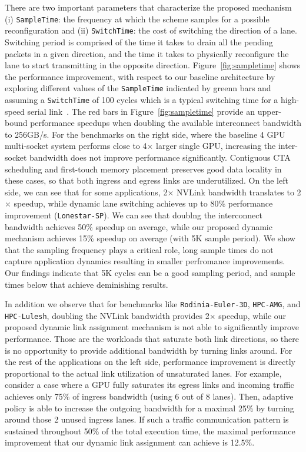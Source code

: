 There are two important parameters that characterize the proposed mechanism (i)
\texttt{SampleTime}: the frequency at which the scheme samples for a possible
reconfiguration and (ii) \texttt{SwitchTime}: the cost of switching the
direction of a lane. Switching period is comprised of the time it takes to
drain all the pending packets in a given direction, and the time it takes to
physically reconfigure the lane to start transmitting in the opposite
direction.  Figure~\ref{fig:sampletime} shows the performance improvement, with
respect to our baseline architecture by exploring different values of the
\texttt{SampleTime} indicated by greenn bars and assuming a \texttt{SwitchTime}
of 100 cycles which is a typical switching time for a high-speed serial
link~\cite{XXX}. The red bars in Figure~\ref{fig:sampletime} provide an
upper-bound performance speedups when doubling the available interconnect
bandwidth to 256GB/s. For the benchmarks on the right side, where the baseline
4 GPU multi-socket system performs close to 4$\times$ larger single GPU,
increasing the inter-socket bandwidth does not improve performance
significantly.  Contiguous CTA scheduling and first-touch memory placement
preserves good data locality in these cases, so that both ingress and egress
links are underutilized. On the left side, we can see that for some
applications, 2$\times$ NVLink bandwidth translates to 2$\times$ speedup, while
dynamic lane switching achieves up to 80\% performance improvement
(\texttt{Lonestar-SP}).  We can see that doublng the interconnect bandwidth
achieves 50\% speedup on average, while our proposed dynamic mechanism achieves
15\% speedup on average (with 5K sample period). We show that the sampling frequency
plays a critical role, long sample times do not capture application dynamics
resulting in smaller perfromance improvements. Our findings indicate that 5K
cycles can be a good sampling period, and sample times below that achieve
deminishing results.

In addition we observe that for benchmarks like \texttt{Rodinia-Euler-3D}, \texttt{HPC-AMG}, and 
\texttt{HPC-Lulesh}, doubling the NVLink bandwidth provides 2$\times$ 
speedup, while our proposed dynamic link assignment mechanism is not 
able to significantly improve performance. Those are the workloads 
that saturate both link directions, so there is no opportunity to 
provide additional bandwidth by turning links around. For the rest of 
the applications on the left side, performance improvement is directly 
proportional to the actual link utilization of unsaturated lanes. For 
example, consider a case where a GPU fully saturates its egress links 
and incoming traffic achieves only 75\% of ingress bandwidth (using 6 
out of 8 lanes). Then, adaptive policy is able to increase the outgoing 
bandwidth for a maximal 25\% by turning around those 2 unused ingress 
lanes. If such a traffic communication pattern is sustained throughout 
50\% of the total execution time, the maximal performance improvement 
that our dynamic link assignment can achieve is 12.5\%.

